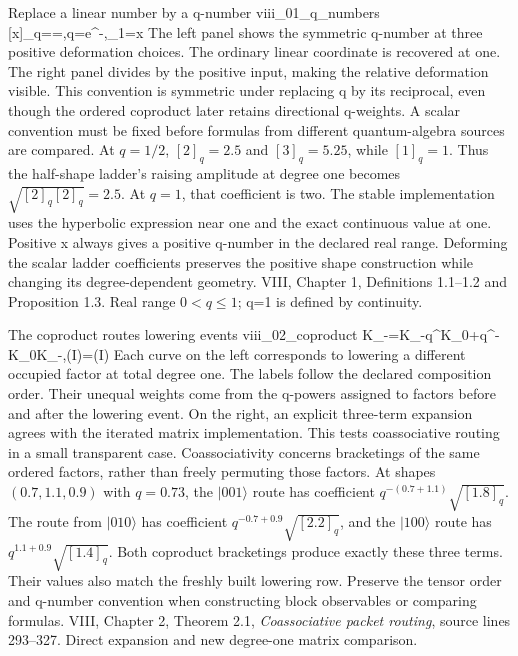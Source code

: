 
{Replace a linear number by a q-number}
{viii_01_q_numbers}
{[x]_q==,\qquad q=e^{-\theta},\quad [x]_1=x}
{The left panel shows the symmetric q-number at three positive deformation choices. The ordinary linear coordinate is recovered at one. The right panel divides by the positive input, making the relative deformation visible. This convention is symmetric under replacing q by its reciprocal, even though the ordered coproduct later retains directional q-weights. A scalar convention must be fixed before formulas from different quantum-algebra sources are compared.}
{At $q=1/2$, $[2]_q=2.5$ and $[3]_q=5.25$, while $[1]_q=1$. Thus the half-shape ladder's raising amplitude at degree one becomes $\sqrt{[2]_q[2]_q}=2.5$. At $q=1$, that coefficient is two. The stable implementation uses the hyperbolic expression near one and the exact continuous value at one. Positive x always gives a positive q-number in the declared real range.}
{Deforming the scalar ladder coefficients preserves the positive shape construction while changing its degree-dependent geometry.}
{VIII, Chapter 1, Definitions 1.1--1.2 and Proposition 1.3. Real range $0<q\leq1$; q=1 is defined by continuity.}

{The coproduct routes lowering events}
{viii_02_coproduct}
{\Delta K_-=K_-\otimes q^{K_0}+q^{-K_0}\otimes K_-,\qquad (\Delta\otimes I)\Delta=(I\otimes\Delta)\Delta}
{Each curve on the left corresponds to lowering a different occupied factor at total degree one. The labels follow the declared composition order. Their unequal weights come from the q-powers assigned to factors before and after the lowering event. On the right, an explicit three-term expansion agrees with the iterated matrix implementation. This tests coassociative routing in a small transparent case. Coassociativity concerns bracketings of the same ordered factors, rather than freely permuting those factors.}
{At shapes $(0.7,1.1,0.9)$ with $q=0.73$, the $|001\rangle$ route has coefficient $q^{-(0.7+1.1)}\sqrt{[1.8]_q}$. The route from $|010\rangle$ has coefficient $q^{-0.7+0.9}\sqrt{[2.2]_q}$, and the $|100\rangle$ route has $q^{1.1+0.9}\sqrt{[1.4]_q}$. Both coproduct bracketings produce exactly these three terms. Their values also match the freshly built lowering row.}
{Preserve the tensor order and q-number convention when constructing block observables or comparing formulas.}
{VIII, Chapter 2, Theorem 2.1, \emph{Coassociative packet routing}, source lines 293--327. Direct expansion and new degree-one matrix comparison.}

